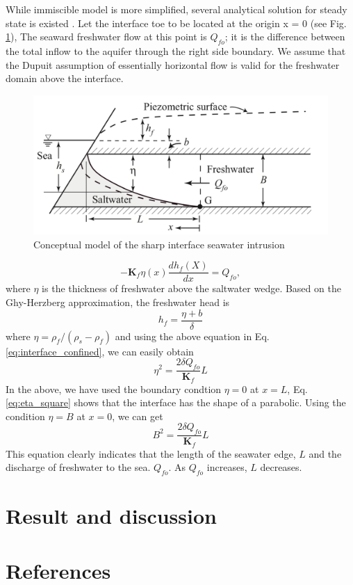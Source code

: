 \documentclass[review]{elsarticle}
\newcommand{\mbf}[1]{{\mathbf{#1}}}%
\begin{document}
While immiscible model is more simplified, several analytical solution for steady state is existed \cite{bear2010modeling}. Let the interface toe to be located at the origin x = 0 (see Fig. \ref{fig:seawater_analytical}), The seaward freshwater flow at this point is $Q_{fo}$; it is the difference between the total inflow to the aquifer through the right side boundary. We assume that the Dupuit assumption of essentially horizontal flow is valid for the freshwater domain above the interface.
\begin{figure}
\centering
\includegraphics[width=1.0\textwidth]{figures/seawater_analytical}
\caption{Conceptual model of the sharp interface seawater intrusion}
\label{fig:seawater_analytical}
\end{figure}
 
\begin{equation}\label{eq:interface_confined}
- \mbf{K}_f \eta(x) \frac{dh_f(X)}{dx} = Q_{fo},
\end{equation}  
where $\eta$ is the thickness of freshwater above the saltwater wedge. Based on the Ghy-Herzberg approximation, the freshwater head is 
\begin{equation}\label{freshwater_head}
h_f = \frac{\eta + b}{\delta}
\end{equation} 
where $\eta = \rho_f / (\rho_s - \rho_f) $ and using the above equation in Eq. \ref{eq:interface_confined}, we can easily obtain 
\begin{equation}\label{eq:eta_square}
\eta^2 = \frac{2\delta Q_{fo}}{\mbf{K}_f} L
\end{equation}
In the above, we have used the boundary condtion $\eta = 0$ at $x = L$, Eq. \ref{eq:eta_square} shows that the interface has the shape of a parabolic. Using the condition $\eta = B$ at $x = 0$, we can get
\begin{equation}\label{eq:B_square}
B^2 = \frac{2\delta Q_{fo}}{\mbf{K}_f}L
\end{equation}
This equation clearly indicates that the length of the seawater edge, $L$ and the discharge of freshwater to the sea. $Q_{fo}$. As $Q_{fo}$ increases, $L$ decreases.











 

\section{Result and discussion}


\section*{References}


\end{document}
